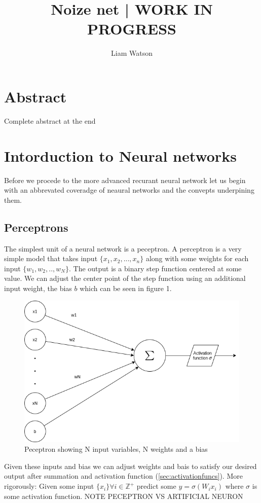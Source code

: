 \documentclass{article}
\title{Noize net | WORK IN PROGRESS}
\author{Liam Watson}
\begin{document}
\maketitle
\tableofcontents
\section{Abstract}
Complete abstract at the end
\section{Intorduction to Neural networks}
\label{sec:intro}
Before we procede to the more advanced recurant neural network let us begin with an abbrevated coveradge of neaural networks and the convepts underpining them. \cite{Nielsen}
\subsection{Perceptrons}
\label{sec:peceptrons}
The simplest unit of a neural network is a peceptron. A perceptron is a very simple model that takes input $\{x_1, x_2, ... ,x_n\}$ along with some weights for each input $\{w_1, w_2, .., w_N\}$. The output is a binary step function centered at some value. \cite{Nielsen} We can adjust the center point of the step function using an additional input weight, the bias $b$ which can be seen in figure 1.
\begin{figure}[H]
\caption{Peceptron showing N input variables, N weights and a bias}
\includegraphics[scale=0.5]{peceptron.png}
\end{figure}
Given these inputs and bias we can adjust weights and bais to satisfy our desired output after summation and activation function (\ref{sec:activationfuncs}). 
More rigorously: Given some input $\{x_i\} \forall i\in \mathbb{Z^+}$ predict some $y=\sigma(W_i x_i)$ where $\sigma$ is some activation function. NOTE PECEPTRON VS ARTIFICIAL NEURON
\end{document}

